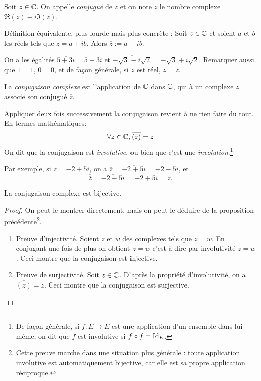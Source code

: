 
\begin{definition}
Soit $z\in\mathbb{C}$.
On appelle \emph{conjugué} de $z$ et on note $\overline z$ le nombre complexe $\Re(z) -i\Im(z)$.
\end{definition}

\begin{remarque}
Définition équivalente, plus lourde mais plus concrète : Soit $z\in \mathbb{C}$ et soient $a$ et $b$ les réels tels que $z=a+ib$. Alors $\overline z := a-ib$. 
\end{remarque}

\begin{exemples}
On a les égalités $\overline{5+3i}=5-3i$ et $\overline{-\sqrt 3-i\sqrt2}=-\sqrt 3+i\sqrt 2$. Remarquer aussi que $\overline 1=1$, $\overline 0 = 0$, et de façon générale, si $z$ est réel, $\overline z = z$.
\end{exemples}

\begin{definition}
La \emph{conjugaison complexe} est l'application de $\mathbb{C}$ dans $\mathbb{C}$, qui à un complexe $z$ associe son conjugué $\overline z$.
\end{definition}

\begin{proposition}
Appliquer deux fois successivement la conjugaison revient à ne rien faire du tout. En termes mathématiques:
\[ \forall z\in\mathbb{C}, \overline{(\overline z)} = z\]
On dit que la conjugaison est \emph{involutive}, ou bien que c'est une \emph{involution}.\footnote{De façon générale, si $f : E\to E$ est une application d'un ensemble dans lui-même, on dit que $f$ est involutive si $f\circ f=\operatorname{Id}_E$.}
\end{proposition}

Par exemple, si $z=-2+5i$, on a $\overline z = \overline{-2+5i} = -2-5i$, et 
\[ \overline{\overline z} = \overline{-2-5i} = -2+5i = z.\]

\begin{proposition}
La conjugaison complexe est bijective.
\end{proposition}
\begin{proof}
On peut le montrer directement, mais on peut le déduire de la proposition précédente\footnote{Cette preuve marche dans une situation plus générale : toute application involutive est automatiquement bijective, car elle est sa propre application réciproque.}. 
\begin{enumerate}
\item Preuve d'injectivité. Soient $z$ et $w$ des complexes tels que $\overline z = \overline w$. En conjugant une fois de plus on obtient $\overline{\overline z}=\overline{\overline w}$ c'est-à-dire par involutivité $z=w$. Ceci montre que la conjugaison est injective.
\item Preuve de surjectivité. Soit $z\in\mathbb{C}$. D'après la propriété d'involutivité, on a $\overline{\left(\overline z\right)}=z$. Ceci montre que la conjugaison est surjective.
\end{enumerate}
\end{proof}


